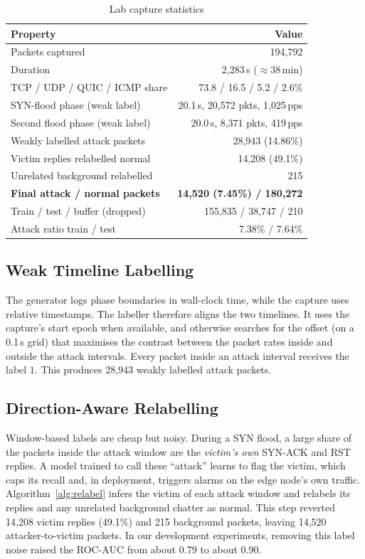 \documentclass[conference]{IEEEtran}
\begin{document}
\begin{table}[t]
\centering
\caption{Lab capture statistics}
\label{tab:dataset}
\footnotesize
\renewcommand{\arraystretch}{1.08}
\setlength{\tabcolsep}{4pt}
\begin{tabular}{@{}l r@{}}
\toprule
\textbf{Property} & \textbf{Value} \\
\midrule
Packets captured & 194,792 \\
Duration & 2,283\,s ($\approx$38\,min) \\
TCP / UDP / QUIC / ICMP share & 73.8 / 16.5 / 5.2 / 2.6\% \\
SYN-flood phase (weak label) & 20.1\,s, 20,572 pkts, 1,025\,pps \\
Second flood phase (weak label) & 20.0\,s, 8,371 pkts, 419\,pps \\
Weakly labelled attack packets & 28,943 (14.86\%) \\
Victim replies relabelled normal & 14,208 (49.1\%) \\
Unrelated background relabelled & 215 \\
\textbf{Final attack / normal packets} & \textbf{14,520 (7.45\%) / 180,272} \\
Train / test / buffer (dropped) & 155,835 / 38,747 / 210 \\
Attack ratio train / test & 7.38\% / 7.64\% \\
\bottomrule
\end{tabular}
\end{table}

\subsection{Weak Timeline Labelling}
The generator logs phase boundaries in wall-clock time, while the capture uses relative timestamps. The labeller therefore aligns the two timelines. It uses the capture's start epoch when available, and otherwise searches for the offset (on a 0.1\,s grid) that maximises the contrast between the packet rates inside and outside the attack intervals. Every packet inside an attack interval receives the label $1$. This produces 28,943 weakly labelled attack packets.

\subsection{Direction-Aware Relabelling}
\label{sec:relabel}
Window-based labels are cheap but noisy. During a SYN flood, a large share of the packets inside the attack window are the \emph{victim's own} SYN-ACK and RST replies. A model trained to call these ``attack'' learns to flag the victim, which caps its recall and, in deployment, triggers alarms on the edge node's own traffic. Algorithm~\ref{alg:relabel} infers the victim of each attack window and relabels its replies and any unrelated background chatter as normal. This step reverted 14,208 victim replies (49.1\%) and 215 background packets, leaving 14,520 attacker-to-victim packets. In our development experiments, removing this label noise raised the ROC-AUC from about 0.79 to about 0.90.
\end{document}
